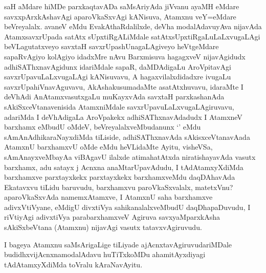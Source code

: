 \begin{artha}
saH aMdare hiMDe parxkaqtavADa saMsAriyAda jiVvanu ayaMH eMdare savxxpArxkAshavAgi aparoVkaSxvAgi kANisuva, Atamxnu veY=eMdare beVreyalalx. avaneV eMdu EvakAthaRdalilxde, deVha modalAdavuyAva nijavAda AtamxsavxrUpada satAtx sUpxtiRgALiMdale satAtxsUpxtiRgaLuLaLxvugaLAgi beVLagutatxveyo savxtaH savxrUpashUnagaLAgiveyo heVtgeMdare sapaRvAgiyo kolAgiyo idadxMre nAvu Barxmisuva hagagxveV nijavAgidudx adhiSAThxnavAgidunx idariMdale sapaR, daMDAdigaLu AroVpitavAgi savxrUpavuLaLxvugaLAgi kANisuvavu, A hagaxvilalxdidadxre ivugaLu savxrUpahiVnavAguvavu, AkAshakusumadaMte asatAtxhuvavu, idaraMte I deVhAdi AnAtamxvasutxgaLu muKayxvAda savxtaH parxkashanAda sAkiSxceVtanavenisida AtamxniMdale savxrUpavuLaLxvugaLAgiruvavu, adariMda I deVhAdigaLa AroVpakekx adhiSAThxnavAdadudx I AtamxneV barxhamx eMbudU oMdeV, beVreyalalxveMbudanunx `\stext' eMdu sAmAnAdhikaraNayxdiMda tiLiside, adhiSAThxnavAda sAkisxceVtanavAada AtamxnU barxhamxvU oMde eMdu heVLidaMte Ayitu, visheVSa, sAmAnayxveMbayAa viBAgavU ilalxde atimahatAtxda niratishayavAda vasutx barxhamx, adu satayx j Acnxna anaMtarUpavAdudu, I tAdAtamxyXdiMda barxhamxve parxtayxkekx parxtayxkekx barxhamxveMdu daqDAhavAda Ekatavxvu tiLidu baruvudu, barxhamxvu paroVkaSxvalalx, matetxVnu?  aparoVkaSxvAda namemxAtamxve, I AtamxnU saha barxhamxve adivxVtiVyane, eMdigU divxtiVya sahikanalalxveMbudU daqDhapaDuvudu, I riVtiyAgi adivxtiVya parabarxhamxveV Agiruva savxyaMparxkAsha sAkiSxbeVtana (Atamxnu) nijavAgi vasutx tatavxvAgiruvudu.
\end{artha}
\begin{artha}
I bageya Atamxnu saMsArigaLige tiLiyade ajAcnxtavAgiruvudariMDale budidhxvijAcnxnamodalAdavu huTiTxkoMDu ahamitAyxdiyagi tAdAtamxyXdiMda toVralu kAraNavAyitu.
\end{artha}


